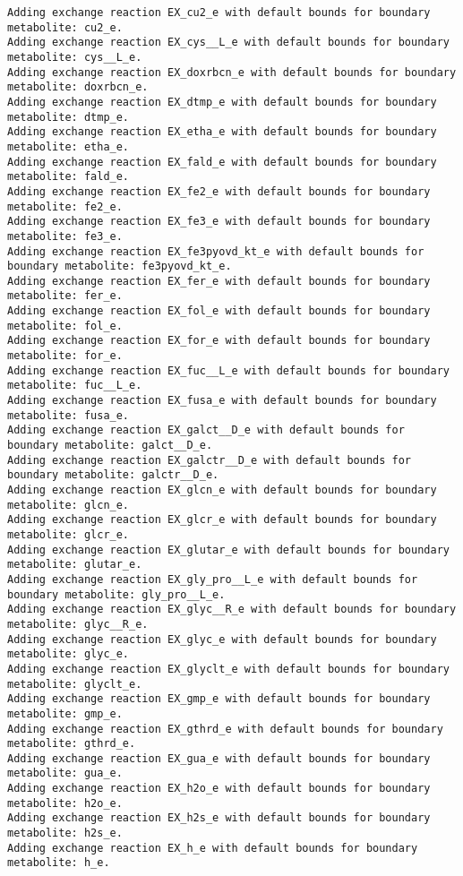 \documentclass[
  letterpaper,
  DIV=11,
  numbers=noendperiod]{scrartcl}
\begin{document}
\begin{verbatim}
Adding exchange reaction EX_cu2_e with default bounds for boundary metabolite: cu2_e.
Adding exchange reaction EX_cys__L_e with default bounds for boundary metabolite: cys__L_e.
Adding exchange reaction EX_doxrbcn_e with default bounds for boundary metabolite: doxrbcn_e.
Adding exchange reaction EX_dtmp_e with default bounds for boundary metabolite: dtmp_e.
Adding exchange reaction EX_etha_e with default bounds for boundary metabolite: etha_e.
Adding exchange reaction EX_fald_e with default bounds for boundary metabolite: fald_e.
Adding exchange reaction EX_fe2_e with default bounds for boundary metabolite: fe2_e.
Adding exchange reaction EX_fe3_e with default bounds for boundary metabolite: fe3_e.
Adding exchange reaction EX_fe3pyovd_kt_e with default bounds for boundary metabolite: fe3pyovd_kt_e.
Adding exchange reaction EX_fer_e with default bounds for boundary metabolite: fer_e.
Adding exchange reaction EX_fol_e with default bounds for boundary metabolite: fol_e.
Adding exchange reaction EX_for_e with default bounds for boundary metabolite: for_e.
Adding exchange reaction EX_fuc__L_e with default bounds for boundary metabolite: fuc__L_e.
Adding exchange reaction EX_fusa_e with default bounds for boundary metabolite: fusa_e.
Adding exchange reaction EX_galct__D_e with default bounds for boundary metabolite: galct__D_e.
Adding exchange reaction EX_galctr__D_e with default bounds for boundary metabolite: galctr__D_e.
Adding exchange reaction EX_glcn_e with default bounds for boundary metabolite: glcn_e.
Adding exchange reaction EX_glcr_e with default bounds for boundary metabolite: glcr_e.
Adding exchange reaction EX_glutar_e with default bounds for boundary metabolite: glutar_e.
Adding exchange reaction EX_gly_pro__L_e with default bounds for boundary metabolite: gly_pro__L_e.
Adding exchange reaction EX_glyc__R_e with default bounds for boundary metabolite: glyc__R_e.
Adding exchange reaction EX_glyc_e with default bounds for boundary metabolite: glyc_e.
Adding exchange reaction EX_glyclt_e with default bounds for boundary metabolite: glyclt_e.
Adding exchange reaction EX_gmp_e with default bounds for boundary metabolite: gmp_e.
Adding exchange reaction EX_gthrd_e with default bounds for boundary metabolite: gthrd_e.
Adding exchange reaction EX_gua_e with default bounds for boundary metabolite: gua_e.
Adding exchange reaction EX_h2o_e with default bounds for boundary metabolite: h2o_e.
Adding exchange reaction EX_h2s_e with default bounds for boundary metabolite: h2s_e.
Adding exchange reaction EX_h_e with default bounds for boundary metabolite: h_e.

\end{verbatim}
\end{document}
